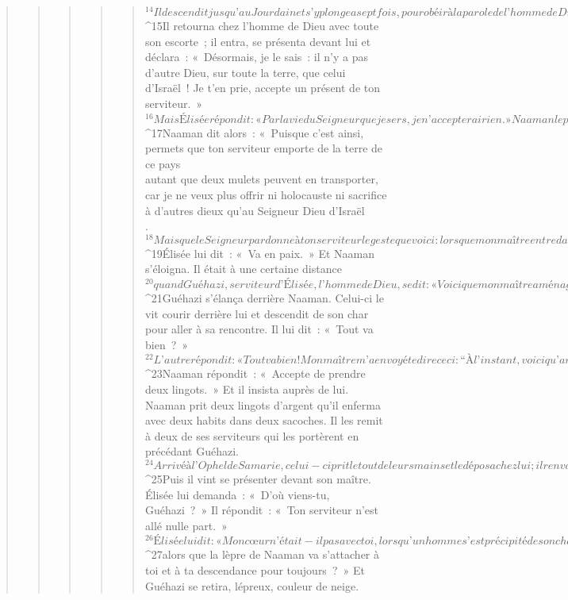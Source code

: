 \begin{verse}
\begin{verse}
\begin{verse}
\begin{verse}
\begin{verse}
${}^{14} Il descendit jusqu’au Jourdain et s’y plongea sept fois, pour obéir à la parole de l’homme de Dieu ; alors sa chair redevint semblable à celle d’un petit enfant : il était purifié !
${}^{15}Il retourna chez l’homme de Dieu avec toute son escorte ; il entra, se présenta devant lui et déclara : « Désormais, je le sais : il n’y a pas d’autre Dieu, sur toute la terre, que celui d’Israël ! Je t’en prie, accepte un présent de ton serviteur. » 
${}^{16}Mais Élisée répondit : « Par la vie du Seigneur que je sers, je n’accepterai rien. » Naaman le pressa d’accepter, mais il refusa. 
${}^{17}Naaman dit alors : « Puisque c’est ainsi, permets que ton serviteur emporte de la terre de ce pays\\autant que deux mulets peuvent en transporter, car je ne veux plus offrir ni holocauste ni sacrifice à d’autres dieux qu’au Seigneur Dieu d’Israël\\. 
${}^{18}Mais que le Seigneur pardonne à ton serviteur le geste que voici : lorsque mon maître entre dans le temple de Rimmone pour s’y prosterner, et qu’il s’appuie sur ma main, je me prosterne aussi dans le temple de Rimmone. Daigne le Seigneur pardonner ce geste à ton serviteur. » 
${}^{19}Élisée lui dit : « Va en paix. » Et Naaman s’éloigna.
      Il était à une certaine distance 
${}^{20}quand Guéhazi, serviteur d’Élisée, l’homme de Dieu, se dit : « Voici que mon maître a ménagé Naaman, cet Araméen, en n’acceptant pas de sa main ce qu’il avait apporté. Par le Seigneur qui est vivant, je vais courir derrière lui, et j’obtiendrai de lui quelque chose. » 
${}^{21}Guéhazi s’élança derrière Naaman. Celui-ci le vit courir derrière lui et descendit de son char pour aller à sa rencontre. Il lui dit : « Tout va bien ? » 
${}^{22}L’autre répondit : « Tout va bien ! Mon maître m’a envoyé te dire ceci : “À l’instant, voici qu’arrivent auprès de moi deux jeunes gens venant de la montagne d’Éphraïm, de chez les frères-prophètes. Donne pour eux, je te prie, un lingot d’argent et deux vêtements de fête.” » 
${}^{23}Naaman répondit : « Accepte de prendre deux lingots. » Et il insista auprès de lui. Naaman prit deux lingots d’argent qu’il enferma avec deux habits dans deux sacoches. Il les remit à deux de ses serviteurs qui les portèrent en précédant Guéhazi. 
${}^{24}Arrivé à l’Ophel de Samarie, celui-ci prit le tout de leurs mains et le déposa chez lui ; il renvoya les hommes, qui s’en allèrent.
${}^{25}Puis il vint se présenter devant son maître. Élisée lui demanda : « D’où viens-tu, Guéhazi ? » Il répondit : « Ton serviteur n’est allé nulle part. » 
${}^{26}Élisée lui dit : « Mon cœur n’était-il pas avec toi, lorsqu’un homme s’est précipité de son char pour aller à ta rencontre ? Est-ce le moment de prendre de l’argent, de prendre des vêtements, des oliviers et des vignes, du petit et du gros bétail, des serviteurs et des servantes, 
${}^{27}alors que la lèpre de Naaman va s’attacher à toi et à ta descendance pour toujours ? » Et Guéhazi se retira, lépreux, couleur de neige.
      

\end{verse}
\end{verse}
\end{verse}
\end{verse}
\end{verse}
